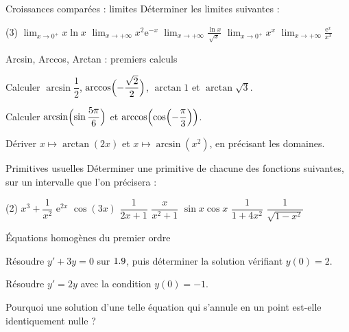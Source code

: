 \begin{exercice}[1]{Croissances comparées : limites}
Déterminer les limites suivantes :
\begin{tasks}(3)
  \task $\displaystyle\lim_{x\to0^{+}}x\ln x$
  \task $\displaystyle\lim_{x\to+\infty}x^{2}\mathrm{e}^{-x}$
  \task $\displaystyle\lim_{x\to+\infty}\frac{\ln x}{\sqrt{x}}$
  \task $\displaystyle\lim_{x\to0^{+}}x^{x}$
  \task $\displaystyle\lim_{x\to+\infty}\frac{\mathrm{e}^{x}}{x^{3}}$
\end{tasks}
\end{exercice}

\begin{exercice}[1]{Arcsin, Arccos, Arctan : premiers calculs}
\begin{questions}
  \item Calculer $\arcsin\dfrac12$, $\arccos\Bigl(-\dfrac{\sqrt2}{2}\Bigr)$,
    $\arctan1$ et $\arctan\sqrt3$.
  \item Calculer $\arcsin\Bigl(\sin\dfrac{5\pi}{6}\Bigr)$ et
    $\arccos\Bigl(\cos\Bigl(-\dfrac{\pi}{3}\Bigr)\Bigr)$.
  \item Dériver $x\mapsto\arctan(2x)$ et $x\mapsto\arcsin(x^{2})$, en
    précisant les domaines.
\end{questions}
\end{exercice}

\begin{exercice}[1]{Primitives usuelles}
Déterminer une primitive de chacune des fonctions suivantes, sur un
intervalle que l'on précisera :
\begin{tasks}(2)
  \task $x^{3}+\dfrac{1}{x^{2}}$
  \task $\mathrm{e}^{2x}$
  \task $\cos(3x)$
  \task $\dfrac{1}{2x+1}$
  \task $\dfrac{x}{x^{2}+1}$
  \task $\sin x\cos x$
  \task $\dfrac{1}{1+4x^{2}}$
  \task $\dfrac{1}{\sqrt{1-x^{2}}}$
\end{tasks}
\end{exercice}

\begin{exercice}[1]{Équations homogènes du premier ordre}
\begin{questions}
  \item Résoudre $y'+3y=0$ sur $1.9$, puis déterminer la solution vérifiant
    $y(0)=2$.
  \item Résoudre $y'=2y$ avec la condition $y(0)=-1$.
  \item Pourquoi une solution d'une telle équation qui s'annule en un point
    est-elle identiquement nulle ?
\end{questions}
\end{exercice}


